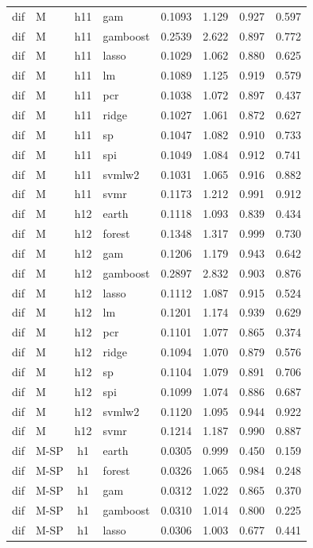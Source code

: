 \begin{ThreePartTable}
\begin{longtable}[t]{llclcccc}
dif & M & h11 & gam & 0.1093 & 1.129 & 0.927 & 0.597\\
dif & M & h11 & gamboost & 0.2539 & 2.622 & 0.897 & 0.772\\
dif & M & h11 & lasso & 0.1029 & 1.062 & 0.880 & 0.625\\
dif & M & h11 & lm & 0.1089 & 1.125 & 0.919 & 0.579\\
dif & M & h11 & pcr & 0.1038 & 1.072 & 0.897 & 0.437\\
dif & M & h11 & ridge & 0.1027 & 1.061 & 0.872 & 0.627\\
dif & M & h11 & sp & 0.1047 & 1.082 & 0.910 & 0.733\\
dif & M & h11 & spi & 0.1049 & 1.084 & 0.912 & 0.741\\
dif & M & h11 & svmlw2 & 0.1031 & 1.065 & 0.916 & 0.882\\
dif & M & h11 & svmr & 0.1173 & 1.212 & 0.991 & 0.912\\
\addlinespace
dif & M & h12 & earth & 0.1118 & 1.093 & 0.839 & 0.434\\
dif & M & h12 & forest & 0.1348 & 1.317 & 0.999 & 0.730\\
dif & M & h12 & gam & 0.1206 & 1.179 & 0.943 & 0.642\\
dif & M & h12 & gamboost & 0.2897 & 2.832 & 0.903 & 0.876\\
dif & M & h12 & lasso & 0.1112 & 1.087 & 0.915 & 0.524\\
dif & M & h12 & lm & 0.1201 & 1.174 & 0.939 & 0.629\\
dif & M & h12 & pcr & 0.1101 & 1.077 & 0.865 & 0.374\\
dif & M & h12 & ridge & 0.1094 & 1.070 & 0.879 & 0.576\\
dif & M & h12 & sp & 0.1104 & 1.079 & 0.891 & 0.706\\
dif & M & h12 & spi & 0.1099 & 1.074 & 0.886 & 0.687\\
dif & M & h12 & svmlw2 & 0.1120 & 1.095 & 0.944 & 0.922\\
dif & M & h12 & svmr & 0.1214 & 1.187 & 0.990 & 0.887\\
\addlinespace
dif & M-SP & h1 & earth & 0.0305 & 0.999 & 0.450 & 0.159\\
dif & M-SP & h1 & forest & 0.0326 & 1.065 & 0.984 & 0.248\\
dif & M-SP & h1 & gam & 0.0312 & 1.022 & 0.865 & 0.370\\
dif & M-SP & h1 & gamboost & 0.0310 & 1.014 & 0.800 & 0.225\\
dif & M-SP & h1 & lasso & 0.0306 & 1.003 & 0.677 & 0.441\\

\end{longtable}
\end{ThreePartTable}
